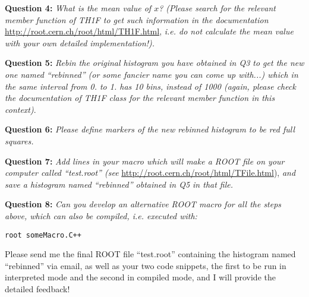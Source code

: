 \documentclass[11pt]{article}
\begin{document}
\bigskip

\noindent\textbf{Question 4:} {\it What is the mean value of $x$? (Please search for the relevant member function of TH1F to get such information in the documentation} \url{http://root.cern.ch/root/html/TH1F.html}, {\it i.e. do not calculate the mean value with your own detailed implementation!).}

\bigskip

\noindent\textbf{Question 5:} {\it Rebin the original histogram you have obtained in Q3 to get the new one named ``rebinned'' (or some fancier name you can come up with...) which in the same interval from 0. to 1. has 10 bins, instead of 1000 (again, please check the documentation of TH1F class for the relevant member function in this context)}.

\bigskip

\noindent\textbf{Question 6:} {\it Please define markers of the new rebinned histogram to be red full squares.} 

\bigskip

\noindent\textbf{Question 7:} {\it Add lines in your macro which will make a ROOT file on your computer called ``test.root'' (see} \url{http://root.cern.ch/root/html/TFile.html}), {\it and save a histogram named ``rebinned'' obtained in Q5 in that file.}

\bigskip

\noindent\textbf{Question 8:} {\it Can you develop an alternative ROOT macro for all the steps above, which can also be compiled, i.e. executed with:}
%
\begin{verbatim}
root someMacro.C++
\end{verbatim}
%

\bigskip

\noindent Please send me the final ROOT file ``test.root'' containing the histogram named ``rebinned'' via email, as well as your two code snippets, the first to be run in interpreted mode and the second in compiled mode, and I will provide the detailed feedback!
\end{document}
